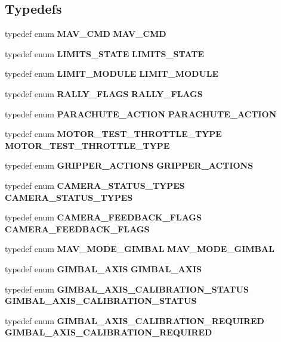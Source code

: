 \subsection*{Typedefs}
\begin{DoxyCompactItemize}
\item 
typedef enum \textbf{ M\+A\+V\+\_\+\+C\+MD} \textbf{ M\+A\+V\+\_\+\+C\+MD}
\item 
typedef enum \textbf{ L\+I\+M\+I\+T\+S\+\_\+\+S\+T\+A\+TE} \textbf{ L\+I\+M\+I\+T\+S\+\_\+\+S\+T\+A\+TE}
\item 
typedef enum \textbf{ L\+I\+M\+I\+T\+\_\+\+M\+O\+D\+U\+LE} \textbf{ L\+I\+M\+I\+T\+\_\+\+M\+O\+D\+U\+LE}
\item 
typedef enum \textbf{ R\+A\+L\+L\+Y\+\_\+\+F\+L\+A\+GS} \textbf{ R\+A\+L\+L\+Y\+\_\+\+F\+L\+A\+GS}
\item 
typedef enum \textbf{ P\+A\+R\+A\+C\+H\+U\+T\+E\+\_\+\+A\+C\+T\+I\+ON} \textbf{ P\+A\+R\+A\+C\+H\+U\+T\+E\+\_\+\+A\+C\+T\+I\+ON}
\item 
typedef enum \textbf{ M\+O\+T\+O\+R\+\_\+\+T\+E\+S\+T\+\_\+\+T\+H\+R\+O\+T\+T\+L\+E\+\_\+\+T\+Y\+PE} \textbf{ M\+O\+T\+O\+R\+\_\+\+T\+E\+S\+T\+\_\+\+T\+H\+R\+O\+T\+T\+L\+E\+\_\+\+T\+Y\+PE}
\item 
typedef enum \textbf{ G\+R\+I\+P\+P\+E\+R\+\_\+\+A\+C\+T\+I\+O\+NS} \textbf{ G\+R\+I\+P\+P\+E\+R\+\_\+\+A\+C\+T\+I\+O\+NS}
\item 
typedef enum \textbf{ C\+A\+M\+E\+R\+A\+\_\+\+S\+T\+A\+T\+U\+S\+\_\+\+T\+Y\+P\+ES} \textbf{ C\+A\+M\+E\+R\+A\+\_\+\+S\+T\+A\+T\+U\+S\+\_\+\+T\+Y\+P\+ES}
\item 
typedef enum \textbf{ C\+A\+M\+E\+R\+A\+\_\+\+F\+E\+E\+D\+B\+A\+C\+K\+\_\+\+F\+L\+A\+GS} \textbf{ C\+A\+M\+E\+R\+A\+\_\+\+F\+E\+E\+D\+B\+A\+C\+K\+\_\+\+F\+L\+A\+GS}
\item 
typedef enum \textbf{ M\+A\+V\+\_\+\+M\+O\+D\+E\+\_\+\+G\+I\+M\+B\+AL} \textbf{ M\+A\+V\+\_\+\+M\+O\+D\+E\+\_\+\+G\+I\+M\+B\+AL}
\item 
typedef enum \textbf{ G\+I\+M\+B\+A\+L\+\_\+\+A\+X\+IS} \textbf{ G\+I\+M\+B\+A\+L\+\_\+\+A\+X\+IS}
\item 
typedef enum \textbf{ G\+I\+M\+B\+A\+L\+\_\+\+A\+X\+I\+S\+\_\+\+C\+A\+L\+I\+B\+R\+A\+T\+I\+O\+N\+\_\+\+S\+T\+A\+T\+US} \textbf{ G\+I\+M\+B\+A\+L\+\_\+\+A\+X\+I\+S\+\_\+\+C\+A\+L\+I\+B\+R\+A\+T\+I\+O\+N\+\_\+\+S\+T\+A\+T\+US}
\item 
typedef enum \textbf{ G\+I\+M\+B\+A\+L\+\_\+\+A\+X\+I\+S\+\_\+\+C\+A\+L\+I\+B\+R\+A\+T\+I\+O\+N\+\_\+\+R\+E\+Q\+U\+I\+R\+ED} \textbf{ G\+I\+M\+B\+A\+L\+\_\+\+A\+X\+I\+S\+\_\+\+C\+A\+L\+I\+B\+R\+A\+T\+I\+O\+N\+\_\+\+R\+E\+Q\+U\+I\+R\+ED}

\end{DoxyCompactItemize}

